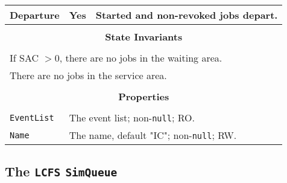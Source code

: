 \documentclass[12pt]{book}
\begin{document}
\begin{tabular}{|l|l|l|}
\hline
Departure & Yes & Started and non-revoked jobs depart. \\
\hline
\multicolumn{3}{|c|}{} \\
\multicolumn{3}{|c|}{\bf State  Invariants} \\
\multicolumn{3}{|c|}{} \\
\hline
\multicolumn{3}{|l|}{If SAC $> 0$, there are no jobs in the waiting area.} \\
\multicolumn{3}{|l|}{There are no jobs in the service area.} \\
\hline
\multicolumn{3}{|c|}{} \\
\multicolumn{3}{|c|}{\bf Properties} \\
\multicolumn{3}{|c|}{} \\
\hline
\lstinline|EventList|       & \multicolumn{2}{|l|}{The event list; non-\lstinline|null|; RO.} \\
\hline
\lstinline|Name|            & \multicolumn{2}{|l|}{The name, default "IC"; non-\lstinline|null|; RW.} \\
\hline
\end{tabular}

\subsection{The \lstinline{LCFS} \lstinline{SimQueue}}
\end{document}
